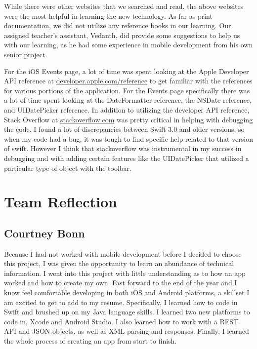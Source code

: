 \documentclass[letterpaper,10pt,draftclsnofoot,onecolumn,titlepage]{IEEEtran}
\begin{document}
While there were other websites that we searched and read, the above websites were the most helpful in learning the new technology.
As far as print documentation, we did not utilize any reference books in our learning.
Our assigned teacher's assistant, Vedanth, did provide some suggestions to help us with our learning, as he had some experience in mobile development from his own senior project.

For the iOS Events page, a lot of time was spent looking at the Apple Developer API reference at \url{developer.apple.com/reference} to get familiar with the references for various portions of the application.
For the Events page specifically there was a lot of time spent looking at the DateFormatter reference, the NSDate reference, and UIDatePicker reference.
In addition to utilizing the developer API reference, Stack Overflow at \url{stackoverflow.com} was pretty critical in helping with debugging the code.
I found a lot of discrepancies between Swift 3.0 and older versions, so when my code had a bug, it was tough to find specific help related to that version of swift.
However I think that stackoverflow was instrumental in my success in debugging and with adding certain features like the UIDatePicker that utilized a particular type of object with the toolbar.

\section{Team Reflection}

	\subsection{Courtney Bonn}

		Because I had not worked with mobile development before I decided to choose this project, I was given the opportunity to learn an abundance of technical information.
		I went into this project with little understanding as to how an app worked and how to create my own.
		Fast forward to the end of the year and I know feel comfortable developing in both iOS and Android platforms, a skillset I am excited to get to add to my resume.
		Specifically, I learned how to code in Swift and brushed up on my Java language skills.
		I learned two new platforms to code in, Xcode and Android Studio.
		I also learned how to work with a REST API and JSON objects, as well as XML parsing and responses.
		Finally, I learned the whole process of creating an app from start to finish.
\end{document}
